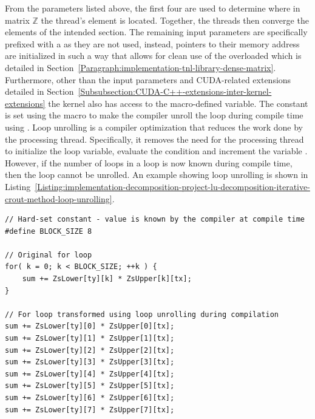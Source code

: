 From the parameters listed above, the first four are used to determine where in matrix $ \mathbb{Z} $ the thread's element is located. Together, the threads then converge the elements of the intended section. The remaining input parameters are specifically prefixed with a \code{\_} as they are not used, instead, pointers to their memory address are initialized in such a way that allows for clean use of the overloaded  which is detailed \textit{} in Section~\ref{Paragraph:implementation-tnl-library-dense-matrix}. \\
Furthermore, other than the input parameters and CUDA-related extensions detailed \textit{} in Section~\ref{Subsubsection:CUDA-C++-extensions-inter-kernel-extensions} the kernel also has access to the macro-defined  variable. The  constant is set using the  macro to make the compiler unroll the  loop during compile time using . Loop unrolling is a compiler optimization that reduces the work done by the processing thread. Specifically, it removes the need for the processing thread to initialize the loop variable, evaluate the condition and increment the variable \cite{Cardoso2017}. However, if the number of loops in a  loop is now known during compile time, then the loop cannot be unrolled. An example showing loop unrolling is shown in Listing~\ref{Listing:implementation-decomposition-project-lu-decomposition-iterative-crout-method-loop-unrolling}.

\begin{lstlisting}[caption={Example demonstrating loop unrolling. In this specific case, if loop unrolling is used, then the processor will not have to: initialize \code{k}, evalute \code{k < BLOCK\_SIZE} nine times and increment \code{k} eight times. If \code{BLOCK\_SIZE} would be obtained as an input parameter, then the loop would not be unrolled as the input parameter is not known during compile time. Taken from \emph{Embedded Computing for High Performance} \cite{Cardoso2017}.},label={Listing:implementation-decomposition-project-lu-decomposition-iterative-crout-method-loop-unrolling}]
// Hard-set constant - value is known by the compiler at compile time
#define BLOCK_SIZE 8

// Original for loop
for( k = 0; k < BLOCK_SIZE; ++k ) {
	sum += ZsLower[ty][k] * ZsUpper[k][tx];
}

// For loop transformed using loop unrolling during compilation
sum += ZsLower[ty][0] * ZsUpper[0][tx];
sum += ZsLower[ty][1] * ZsUpper[1][tx];
sum += ZsLower[ty][2] * ZsUpper[2][tx];
sum += ZsLower[ty][3] * ZsUpper[3][tx];
sum += ZsLower[ty][4] * ZsUpper[4][tx];
sum += ZsLower[ty][5] * ZsUpper[5][tx];
sum += ZsLower[ty][6] * ZsUpper[6][tx];
sum += ZsLower[ty][7] * ZsUpper[7][tx];
\end{lstlisting}

